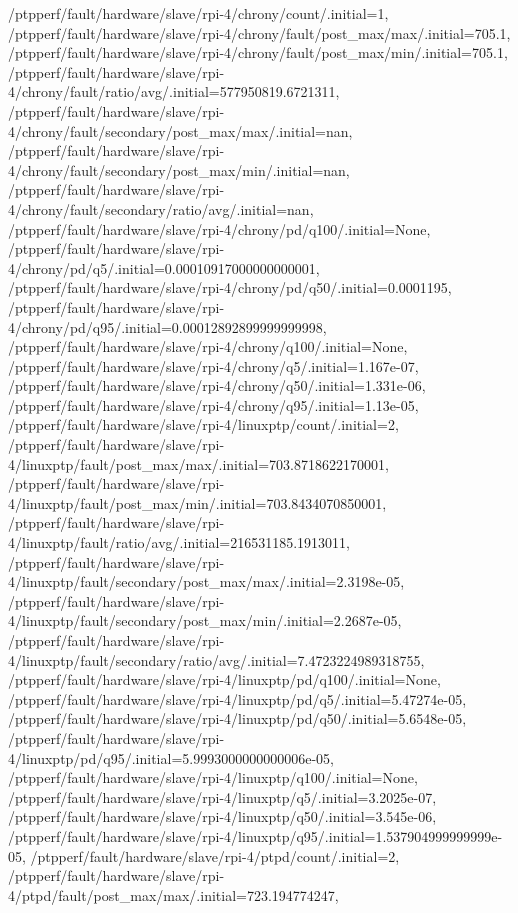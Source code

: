 {    /ptpperf/fault/hardware/slave/rpi-4/chrony/count/.initial=1,
    /ptpperf/fault/hardware/slave/rpi-4/chrony/fault/post_max/max/.initial=705.1,
    /ptpperf/fault/hardware/slave/rpi-4/chrony/fault/post_max/min/.initial=705.1,
    /ptpperf/fault/hardware/slave/rpi-4/chrony/fault/ratio/avg/.initial=577950819.6721311,
    /ptpperf/fault/hardware/slave/rpi-4/chrony/fault/secondary/post_max/max/.initial=nan,
    /ptpperf/fault/hardware/slave/rpi-4/chrony/fault/secondary/post_max/min/.initial=nan,
    /ptpperf/fault/hardware/slave/rpi-4/chrony/fault/secondary/ratio/avg/.initial=nan,
    /ptpperf/fault/hardware/slave/rpi-4/chrony/pd/q100/.initial=None,
    /ptpperf/fault/hardware/slave/rpi-4/chrony/pd/q5/.initial=0.00010917000000000001,
    /ptpperf/fault/hardware/slave/rpi-4/chrony/pd/q50/.initial=0.0001195,
    /ptpperf/fault/hardware/slave/rpi-4/chrony/pd/q95/.initial=0.00012892899999999998,
    /ptpperf/fault/hardware/slave/rpi-4/chrony/q100/.initial=None,
    /ptpperf/fault/hardware/slave/rpi-4/chrony/q5/.initial=1.167e-07,
    /ptpperf/fault/hardware/slave/rpi-4/chrony/q50/.initial=1.331e-06,
    /ptpperf/fault/hardware/slave/rpi-4/chrony/q95/.initial=1.13e-05,
    /ptpperf/fault/hardware/slave/rpi-4/linuxptp/count/.initial=2,
    /ptpperf/fault/hardware/slave/rpi-4/linuxptp/fault/post_max/max/.initial=703.8718622170001,
    /ptpperf/fault/hardware/slave/rpi-4/linuxptp/fault/post_max/min/.initial=703.8434070850001,
    /ptpperf/fault/hardware/slave/rpi-4/linuxptp/fault/ratio/avg/.initial=216531185.1913011,
    /ptpperf/fault/hardware/slave/rpi-4/linuxptp/fault/secondary/post_max/max/.initial=2.3198e-05,
    /ptpperf/fault/hardware/slave/rpi-4/linuxptp/fault/secondary/post_max/min/.initial=2.2687e-05,
    /ptpperf/fault/hardware/slave/rpi-4/linuxptp/fault/secondary/ratio/avg/.initial=7.4723224989318755,
    /ptpperf/fault/hardware/slave/rpi-4/linuxptp/pd/q100/.initial=None,
    /ptpperf/fault/hardware/slave/rpi-4/linuxptp/pd/q5/.initial=5.47274e-05,
    /ptpperf/fault/hardware/slave/rpi-4/linuxptp/pd/q50/.initial=5.6548e-05,
    /ptpperf/fault/hardware/slave/rpi-4/linuxptp/pd/q95/.initial=5.9993000000000006e-05,
    /ptpperf/fault/hardware/slave/rpi-4/linuxptp/q100/.initial=None,
    /ptpperf/fault/hardware/slave/rpi-4/linuxptp/q5/.initial=3.2025e-07,
    /ptpperf/fault/hardware/slave/rpi-4/linuxptp/q50/.initial=3.545e-06,
    /ptpperf/fault/hardware/slave/rpi-4/linuxptp/q95/.initial=1.537904999999999e-05,
    /ptpperf/fault/hardware/slave/rpi-4/ptpd/count/.initial=2,
    /ptpperf/fault/hardware/slave/rpi-4/ptpd/fault/post_max/max/.initial=723.194774247,
}
